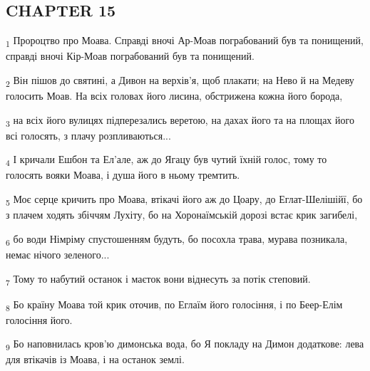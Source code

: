 \subsection{CHAPTER 15}
\begin{tcolorbox}
\textsubscript{1} Пророцтво про Моава. Справді вночі Ар-Моав пограбований був та понищений, справді вночі Кір-Моав пограбований був та понищений.
\end{tcolorbox}
\begin{tcolorbox}
\textsubscript{2} Він пішов до святині, а Дивон на верхів'я, щоб плакати; на Нево й на Медеву голосить Моав. На всіх головах його лисина, обстрижена кожна його борода,
\end{tcolorbox}
\begin{tcolorbox}
\textsubscript{3} на всіх його вулицях підперезались веретою, на дахах його та на площах його всі голосять, з плачу розпливаються...
\end{tcolorbox}
\begin{tcolorbox}
\textsubscript{4} І кричали Ешбон та Ел'але, аж до Ягацу був чутий їхній голос, тому то голосять вояки Моава, і душа його в ньому тремтить.
\end{tcolorbox}
\begin{tcolorbox}
\textsubscript{5} Моє серце кричить про Моава, втікачі його аж до Цоару, до Еглат-Шелішійї, бо з плачем ходять збіччям Лухіту, бо на Хоронаїмській дорозі встає крик загибелі,
\end{tcolorbox}
\begin{tcolorbox}
\textsubscript{6} бо води Німріму спустошенням будуть, бо посохла трава, мурава позникала, немає нічого зеленого...
\end{tcolorbox}
\begin{tcolorbox}
\textsubscript{7} Тому то набутий останок і маєток вони віднесуть за потік степовий.
\end{tcolorbox}
\begin{tcolorbox}
\textsubscript{8} Бо країну Моава той крик оточив, по Еглаїм його голосіння, і по Беер-Елім голосіння його.
\end{tcolorbox}
\begin{tcolorbox}
\textsubscript{9} Бо наповнилась кров'ю димонська вода, бо Я покладу на Димон додаткове: лева для втікачів із Моава, і на останок землі.
\end{tcolorbox}
